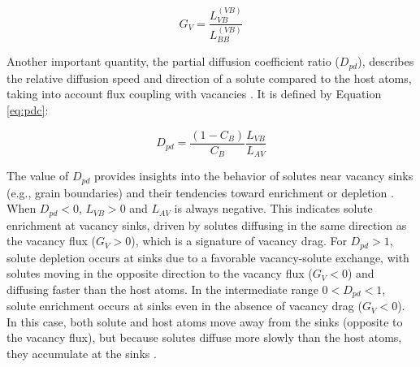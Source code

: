 \documentclass[preprint,12pt]{elsarticle}
\begin{document}
\begin{equation}
\label{eq:drag}
G_V = \frac{L_{VB}^{(VB)}}{L_{BB}^{(VB)}}
\end{equation}

Another important quantity, the partial diffusion coefficient ratio ($D_{pd}$), describes the relative diffusion speed and direction of a solute compared to the host atoms, taking into account flux coupling with vacancies \citep{messina_exact_2014,messina_solute_2020}. It is defined by Equation \ref{eq:pdc}:

\begin{equation}
\label{eq:pdc}
D_{pd} = \frac{(1-C_B)}{C_B} \frac{L_{VB}}{L_{AV}}
\end{equation}

The value of $D_{pd}$ provides insights into the behavior of solutes near vacancy sinks (e.g., grain boundaries) and their tendencies toward enrichment or depletion \citep{messina_exact_2014}. When $D_{pd} < 0$, $L_{VB} > 0$ and $L_{AV}$ is always negative. This indicates solute enrichment at vacancy sinks, driven by solutes diffusing in the same direction as the vacancy flux ($G_V > 0$), which is a signature of vacancy drag. For $D_{pd} > 1$, solute depletion occurs at sinks due to a favorable vacancy-solute exchange, with solutes moving in the opposite direction to the vacancy flux ($G_V < 0$) and diffusing faster than the host atoms. In the intermediate range $0 < D_{pd} < 1$, solute enrichment occurs at sinks even in the absence of vacancy drag ($G_V < 0$). In this case, both solute and host atoms move away from the sinks (opposite to the vacancy flux), but because solutes diffuse more slowly than the host atoms, they accumulate at the sinks \citep{messina_exact_2014}.

\FloatBarrier
\end{document}
